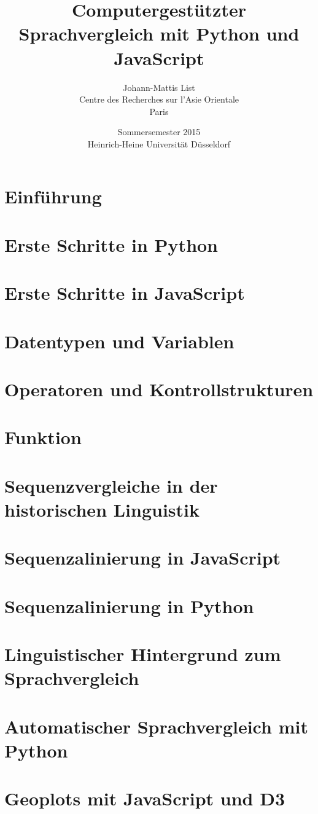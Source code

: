 \documentclass[xetex,11pt]{scrartcl}
\title{Computergestützter Sprachvergleich mit Python und JavaScript}
\author{Johann-Mattis List \\ Centre des Recherches sur l'Asie Orientale \\ Paris}
\date{Sommersemester 2015 \\ Heinrich-Heine Universität Düsseldorf}
\begin{document}
\maketitle
\tableofcontents
\pagebreak
\section{Einführung}

\section{Erste Schritte in Python}

\section{Erste Schritte in JavaScript}

\section{Datentypen und Variablen}

\section{Operatoren und Kontrollstrukturen}

\section{Funktion}

\section{Sequenzvergleiche in der historischen Linguistik}

\section{Sequenzalinierung in JavaScript}

\section{Sequenzalinierung in Python}


\section{Linguistischer Hintergrund zum Sprachvergleich}

\section{Automatischer Sprachvergleich mit Python}

\section{Geoplots mit JavaScript und D3}

\end{document}
